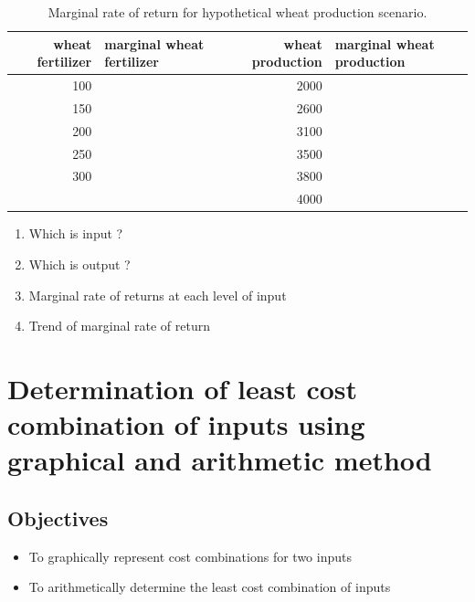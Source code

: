 \documentclass[
]{article}
\providecommand{\tightlist}{%
  \setlength{\itemsep}{0pt}\setlength{\parskip}{0pt}}
\begin{document}
\begin{table}[H]

\caption{\label{tab:nitrogen-wheat-dmr-tab}Marginal rate of return for hypothetical wheat production scenario.}
\centering
\fontsize{8}{10}\selectfont
\begin{tabular}[t]{rlrl}
\toprule
wheat fertilizer & marginal wheat fertilizer & wheat production & marginal wheat production\\
\midrule
100 &  & 2000 & \\
150 &  & 2600 & \\
200 &  & 3100 & \\
250 &  & 3500 & \\
300 &  & 3800 & \\
\addlinespace
350 &  & 4000 & \\
\bottomrule
\end{tabular}
\end{table}

\begin{enumerate}
\def\labelenumi{\alph{enumi}.}
\tightlist
\item
  Which is input ?
\item
  Which is output ?
\item
  Marginal rate of returns at each level of input
\item
  Trend of marginal rate of return
\end{enumerate}

\clearpage

\hypertarget{determination-of-least-cost-combination-of-inputs-using-graphical-and-arithmetic-method}{%
\section{Determination of least cost combination of inputs using graphical and arithmetic method}\label{determination-of-least-cost-combination-of-inputs-using-graphical-and-arithmetic-method}}

\hypertarget{objectives-1}{%
\subsection*{Objectives}\label{objectives-1}}

\begin{itemize}
\tightlist
\item
  To graphically represent cost combinations for two inputs
\item
  To arithmetically determine the least cost combination of inputs
\end{itemize}
\end{document}
